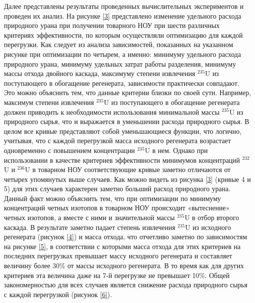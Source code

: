 Далее представлены результаты проведенных вычислительных экспериментов и проведен их анализ. 
На рисунке \ref{3} представлено изменение удельного расхода природного урана при получении товарного НОУ при шести различных критериях эффективности, по которым осуществляли оптимизацию для каждой перегрузки. Как следует из анализа зависимостей, показанных на указанном рисунке при оптимизации по четырем, а именно: минимуму удельного расхода природного урана, минимуму удельных затрат работы разделения, минимуму массы отхода двойного каскада, максимуму степени извлечения $^{235}$U из поступающего в обогащение регенерата, зависимости практически совпадают. Это можно объяснить тем, что данные критерии близки по своей сути. Например, максимум степени извлечения $^{235}$U из поступающего в обогащение регенерата должен приводить к необходимости использования минимальной массы $^{235}$U из природного сырья, что и выражается в уменьшении расхода природного сырья. В целом все кривые представляют собой уменьшающиеся функции, что логично, учитывая, что с каждой перегрузкой масса исходного регенерата возрастает одновременно с повышением концентрации $^{235}$U в нем. Однако при использовании в качестве критериев эффективности минимумов концентраций $^{232}$U и $^{236}$U в товарном НОУ соответствующие кривые заметно отличаются от четырех упомянутых выше случаев. Как можно видеть из рисунка \ref{3} (кривые 4 и 5) для этих случаев характерен заметно больший расход природного урана. Данный факт можно объяснить тем, что при оптимизации по минимуму концентраций четных изотопов в товарном НОУ происходит «вытеснение» четных изотопов, а вместе с ними и значительной массы $^{235}$U в отбор второго каскада. В результате заметно падает степень извлечения $^{235}$U из исходного регенерата (рисунок \ref{4}) и масса отхода, что отчетливо заметно по зависимостям на рисунке \ref{5}, в соответствии с которыми масса отхода для этих критериев на последних перегрузках превышает массу исходного регенерата и составляет величину более 30\% от массы исходного регенерата. В то время как для других критериев эта величина даже на 7-й перегрузке не превышает 10\%. Общей закономерностью для всех случаев является снижение расхода природного сырья с каждой перегрузкой (рисунок \ref{6}).


